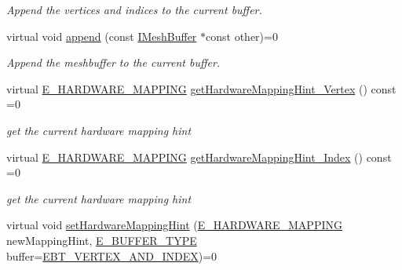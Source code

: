\begin{DoxyCompactItemize}
\begin{DoxyCompactList}\small\item\em Append the vertices and indices to the current buffer. \end{DoxyCompactList}\item 
virtual void \hyperlink{classirr_1_1scene_1_1IMeshBuffer_a79d2737962579138183ed0fd324310b3}{append} (const \hyperlink{classirr_1_1scene_1_1IMeshBuffer}{I\+Mesh\+Buffer} $\ast$const other)=0
\begin{DoxyCompactList}\small\item\em Append the meshbuffer to the current buffer. \end{DoxyCompactList}\item 
\mbox{\label{classirr_1_1scene_1_1IMeshBuffer_abbf42191b2fb4d2f7094a77fd76a530e}} 
virtual \hyperlink{namespaceirr_1_1scene_ac7d8ee8d77da75f2580bb9bb17231c27}{E\+\_\+\+H\+A\+R\+D\+W\+A\+R\+E\+\_\+\+M\+A\+P\+P\+I\+NG} \hyperlink{classirr_1_1scene_1_1IMeshBuffer_abbf42191b2fb4d2f7094a77fd76a530e}{get\+Hardware\+Mapping\+Hint\+\_\+\+Vertex} () const =0
\begin{DoxyCompactList}\small\item\em get the current hardware mapping hint \end{DoxyCompactList}\item 
\mbox{\label{classirr_1_1scene_1_1IMeshBuffer_a2260f9efb3fad4ba9581e18fccaad5a7}} 
virtual \hyperlink{namespaceirr_1_1scene_ac7d8ee8d77da75f2580bb9bb17231c27}{E\+\_\+\+H\+A\+R\+D\+W\+A\+R\+E\+\_\+\+M\+A\+P\+P\+I\+NG} \hyperlink{classirr_1_1scene_1_1IMeshBuffer_a2260f9efb3fad4ba9581e18fccaad5a7}{get\+Hardware\+Mapping\+Hint\+\_\+\+Index} () const =0
\begin{DoxyCompactList}\small\item\em get the current hardware mapping hint \end{DoxyCompactList}\item 
\mbox{\label{classirr_1_1scene_1_1IMeshBuffer_a133c2ee78c14db43e0fec3d3e300700a}} 
virtual void \hyperlink{classirr_1_1scene_1_1IMeshBuffer_a133c2ee78c14db43e0fec3d3e300700a}{set\+Hardware\+Mapping\+Hint} (\hyperlink{namespaceirr_1_1scene_ac7d8ee8d77da75f2580bb9bb17231c27}{E\+\_\+\+H\+A\+R\+D\+W\+A\+R\+E\+\_\+\+M\+A\+P\+P\+I\+NG} new\+Mapping\+Hint, \hyperlink{namespaceirr_1_1scene_a8f59a89ffef0ad8e5b2c2cb874a93e8c}{E\+\_\+\+B\+U\+F\+F\+E\+R\+\_\+\+T\+Y\+PE} buffer=\hyperlink{namespaceirr_1_1scene_a8f59a89ffef0ad8e5b2c2cb874a93e8ca34ea664123fbc28610408e51b014dcdd}{E\+B\+T\+\_\+\+V\+E\+R\+T\+E\+X\+\_\+\+A\+N\+D\+\_\+\+I\+N\+D\+EX})=0

\end{DoxyCompactItemize}
